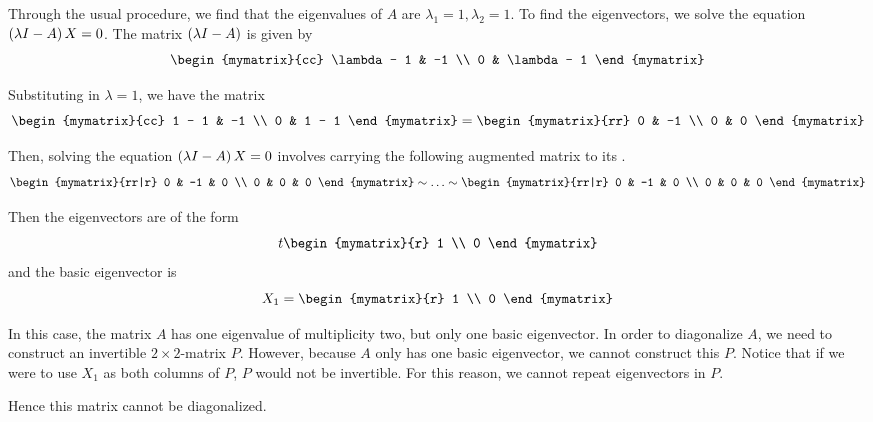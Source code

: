 \begin{solution}
Through the usual procedure, we find that the eigenvalues of $A$ are $\lambda_1 =1, \lambda_2=1$. 
To find the eigenvectors, we solve the equation $\left(\lambda I - A \right) X = 0$.
The matrix $\left(\lambda I -A \right)$ is given by 
\begin{equation*}
\begin{mymatrix}{cc}
\lambda - 1 & -1 \\
0 & \lambda - 1
\end{mymatrix}
\end{equation*}

Substituting in $\lambda = 1$, we have the matrix
\begin{equation*}
\begin{mymatrix}{cc}
1 - 1 & -1 \\
0 & 1 - 1
\end{mymatrix}
=
\begin{mymatrix}{rr}
0 & -1 \\
0 & 0
\end{mymatrix}
\end{equation*}

Then, solving the equation $\left(\lambda I - A\right) X = 0$ 
involves carrying the following augmented matrix to its {\rref}. 
\begin{equation*}
\begin{mymatrix}{rr|r}
0 & -1 & 0 \\
0 & 0 & 0
\end{mymatrix} 
\sim\ldots\sim
\begin{mymatrix}{rr|r}
0 & -1 & 0 \\
0 & 0 & 0
\end{mymatrix} 
\end{equation*}

Then the eigenvectors are of the form
\begin{equation*}
t\begin{mymatrix}{r}
1 \\
0
\end{mymatrix}
\end{equation*}
and the basic eigenvector is 
\begin{equation*}
X_1
=
\begin{mymatrix}{r}
1 \\
0
\end{mymatrix}
\end{equation*}

In this case, the matrix $A$ has one eigenvalue of multiplicity two, 
but only one basic eigenvector. In order to diagonalize $A$, we need to construct
an invertible $2\times 2$-matrix $P$. However, because $A$ only has one basic eigenvector,
we cannot construct this $P$. Notice that if we were to use $X_1$ as both columns of $P$, $P$ would not be invertible. For this reason, we cannot repeat eigenvectors in $P$.

Hence this matrix cannot be diagonalized. 
\end{solution}

